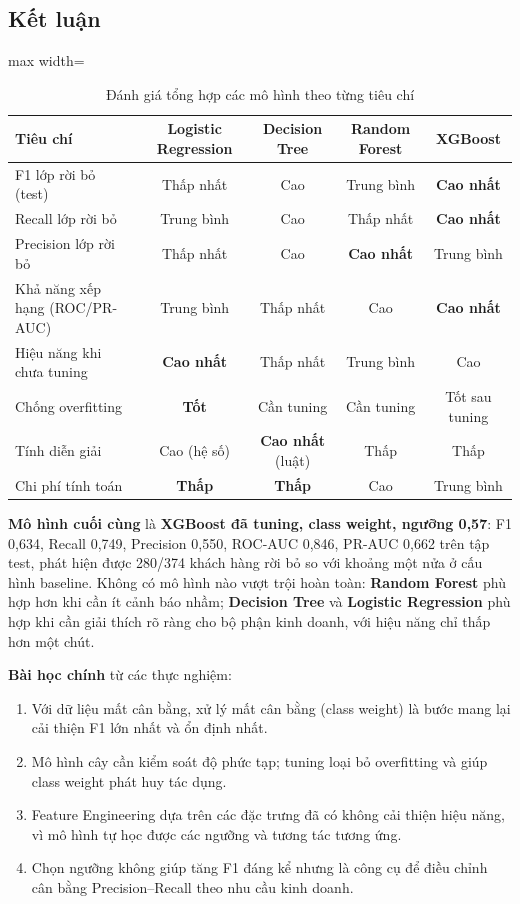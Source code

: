 \subsection{Kết luận}

\begin{table}[H]
\centering
\small
\begin{adjustbox}{max width=\textwidth}
\begin{tabular}{|l|c|c|c|c|}
\hline
\textbf{Tiêu chí} & \textbf{Logistic Regression} & \textbf{Decision Tree} & \textbf{Random Forest} & \textbf{XGBoost} \\
\hline
F1 lớp rời bỏ (test) & Thấp nhất & Cao & Trung bình & \textbf{Cao nhất} \\
\hline
Recall lớp rời bỏ & Trung bình & Cao & Thấp nhất & \textbf{Cao nhất} \\
\hline
Precision lớp rời bỏ & Thấp nhất & Cao & \textbf{Cao nhất} & Trung bình \\
\hline
Khả năng xếp hạng (ROC/PR-AUC) & Trung bình & Thấp nhất & Cao & \textbf{Cao nhất} \\
\hline
Hiệu năng khi chưa tuning & \textbf{Cao nhất} & Thấp nhất & Trung bình & Cao \\
\hline
Chống overfitting & \textbf{Tốt} & Cần tuning & Cần tuning & Tốt sau tuning \\
\hline
Tính diễn giải & Cao (hệ số) & \textbf{Cao nhất} (luật) & Thấp & Thấp \\
\hline
Chi phí tính toán & \textbf{Thấp} & \textbf{Thấp} & Cao & Trung bình \\
\hline
\end{tabular}
\end{adjustbox}
\caption{Đánh giá tổng hợp các mô hình theo từng tiêu chí}
\end{table}

\textbf{Mô hình cuối cùng} là \textbf{XGBoost đã tuning, class weight, ngưỡng 0,57}: F1 0,634, Recall 0,749, Precision 0,550, ROC-AUC 0,846, PR-AUC 0,662 trên tập test, phát hiện được 280/374 khách hàng rời bỏ so với khoảng một nửa ở cấu hình baseline. Không có mô hình nào vượt trội hoàn toàn: \textbf{Random Forest} phù hợp hơn khi cần ít cảnh báo nhầm; \textbf{Decision Tree} và \textbf{Logistic Regression} phù hợp khi cần giải thích rõ ràng cho bộ phận kinh doanh, với hiệu năng chỉ thấp hơn một chút.

\textbf{Bài học chính} từ các thực nghiệm:
\begin{enumerate}
    \item Với dữ liệu mất cân bằng, xử lý mất cân bằng (class weight) là bước mang lại cải thiện F1 lớn nhất và ổn định nhất.
    \item Mô hình cây cần kiểm soát độ phức tạp; tuning loại bỏ overfitting và giúp class weight phát huy tác dụng.
    \item Feature Engineering dựa trên các đặc trưng đã có không cải thiện hiệu năng, vì mô hình tự học được các ngưỡng và tương tác tương ứng.
    \item Chọn ngưỡng không giúp tăng F1 đáng kể nhưng là công cụ để điều chỉnh cân bằng Precision--Recall theo nhu cầu kinh doanh.
\end{enumerate}

